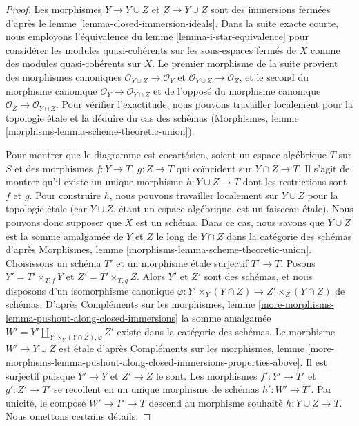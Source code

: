 \begin{proof}
Les morphismes $Y \to Y \cup Z$ et $Z \to Y \cup Z$ sont des immersions fermées
d'après le lemme \ref{lemma-closed-immersion-ideals}. Dans la suite exacte courte,
nous employons l'équivalence du lemme \ref{lemma-i-star-equivalence} pour considérer les
modules quasi-cohérents sur les sous-espaces fermés de $X$ comme des modules quasi-cohérents
sur $X$. Le premier morphisme de la suite provient des morphismes canoniques
$\mathcal{O}_{Y \cup Z} \to \mathcal{O}_Y$ et
$\mathcal{O}_{Y \cup Z} \to \mathcal{O}_Z$,
et le second du morphisme canonique
$\mathcal{O}_Y \to \mathcal{O}_{Y \cap Z}$ et de
l'opposé du morphisme canonique
$\mathcal{O}_Z \to \mathcal{O}_{Y \cap Z}$. Pour vérifier
l'exactitude, nous pouvons travailler localement pour la topologie étale et la déduire
du cas des schémas
(Morphismes, lemme \ref{morphisms-lemma-scheme-theoretic-union}).

\medskip\noindent
Pour montrer que le diagramme est cocartésien, soient un espace algébrique
$T$ sur $S$ et des morphismes $f : Y \to T$, $g : Z \to T$ qui coïncident sur
$Y \cap Z \to T$. Il s'agit de montrer qu'il existe un unique morphisme
$h : Y \cup Z \to T$ dont les restrictions sont $f$ et $g$.
Pour construire $h$, nous pouvons travailler localement sur $Y \cup Z$ pour la topologie étale
(car $Y \cup Z$, étant un espace algébrique, est un faisceau étale).
Nous pouvons donc supposer que $X$ est un schéma.
Dans ce cas, nous savons que $Y \cup Z$ est la somme amalgamée
de $Y$ et $Z$ le long de $Y \cap Z$ dans la catégorie des schémas
d'après Morphismes, lemme \ref{morphisms-lemma-scheme-theoretic-union}.
Choisissons un schéma $T'$ et un morphisme étale surjectif $T' \to T$.
Posons $Y' = T' \times_{T, f} Y$ et $Z' = T' \times_{T, g} Z$.
Alors $Y'$ et $Z'$ sont des schémas, et nous disposons d'un isomorphisme canonique
$\varphi : Y' \times_Y (Y \cap Z) \to Z' \times_Z (Y \cap Z)$
de schémas. D'après Compléments sur les morphismes, lemme
\ref{more-morphisms-lemma-pushout-along-closed-immersions}
la somme amalgamée $W' = Y' \amalg_{Y' \times_Y (Y \cap Z), \varphi} Z'$
existe dans la catégorie des schémas.
Le morphisme $W' \to Y \cup Z$ est étale d'après
Compléments sur les morphismes, lemme
\ref{more-morphisms-lemma-pushout-along-closed-immersions-properties-above}.
Il est surjectif puisque $Y' \to Y$ et $Z' \to Z$ le sont.
Les morphismes $f' : Y' \to T'$ et $g' : Z' \to T'$
se recollent en un unique morphisme de schémas $h' : W' \to T'$.
Par unicité, le composé $W' \to T' \to T$
descend au morphisme souhaité $h : Y \cup Z \to T$.
Nous omettons certains détails.
\end{proof}






